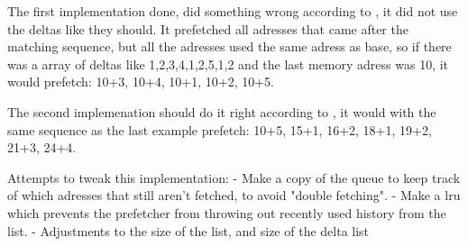 The first implementation done, did something wrong according to \cite{dcptpaper}, it did not use the deltas like they should. It prefetched all adresses that came after the matching sequence, but all the adresses used the same adress as base, so if there was a array of deltas like 1,2,3,4,1,2,5,1,2 and the last memory adress was 10, it would prefetch: 10+3, 10+4, 10+1, 10+2, 10+5.

The second implemenation should do it right according to \cite{dcptpaper}, it would with the same sequence as the last example prefetch: 10+5, 15+1, 16+2, 18+1, 19+2, 21+3, 24+4.

Attempts to tweak this implementation:
- Make a copy of the queue to keep track of which adresses that still aren't fetched, to avoid "double fetching".
- Make a lru which prevents the prefetcher from throwing out recently used history from the list.
- Adjustments to the size of the list, and size of the delta list


